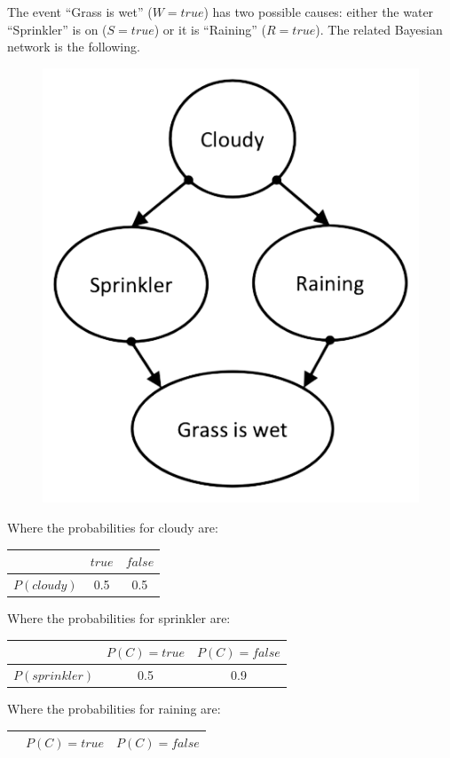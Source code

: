 \documentclass[12pt, a4paper]{report}
\newtheorem[style=M,bodystyle=\normalfont]{theorem}{Theorem}
\newtheorem[style=M,bodystyle=\normalfont]{corollary}{Corollary}
\newtheorem[style=M,bodystyle=\normalfont]{lemma}{Lemma}
\newtheorem[style=M,bodystyle=\normalfont]{definition}{Definition}
\begin{document}
    \begin{example}
        The event “Grass is wet” ($W=true$) has two possible causes: either the water “Sprinkler” is on ($S=true$) or it is “Raining”
        ($R=true$). The related Bayesian network is the following.
        \begin{figure}[H]
            \centering
            \includegraphics[width=0.4\linewidth]{images/sprinkler.png}
        \end{figure}
        Where the probabilities for cloudy are: 
        \begin{table}[H]
            \centering
            \begin{tabular}{c|cc|}
            \cline{2-3}
                                              & $true$ & $false$ \\ \hline
            \multicolumn{1}{|c|}{$P(cloudy)$} & 0.5    & 0.5     \\ \hline
            \end{tabular}
        \end{table}
        Where the probabilities for sprinkler are: 
        \begin{table}[H]
            \centering
            \begin{tabular}{c|cc|}
            \cline{2-3}
                                                 & $P(C)=true$ & $P(C)=false$ \\ \hline
            \multicolumn{1}{|c|}{$P(sprinkler)$} & 0.5         & 0.9          \\ \hline
            \end{tabular}
        \end{table}
        Where the probabilities for raining are: 
        \begin{table}[H]
            \centering
            \begin{tabular}{c|cc|}
            \cline{2-3}
                                               & $P(C)=true$ & $P(C)=false$ \\ \hline

\end{tabular}
\end{table}
\end{example}
\end{document}
